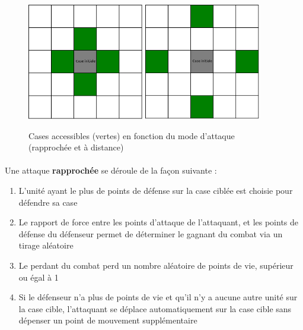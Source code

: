 \begin{figure}
  \centering
  \includegraphics[width=2in]{./schemas/near_attack.png}
  \includegraphics[width=2in]{./schemas/long_attack.png}
  \caption{Cases accessibles (vertes) en fonction du mode d'attaque (rapprochée et à distance)}
  \label{fig:attack}
\end{figure}

\paragraph{}
Une attaque \textbf{rapprochée} se déroule de la façon suivante :

\begin{enumerate}
  \item L'unité ayant le plus de points de défense sur la case ciblée est choisie pour défendre sa case
  \item Le rapport de force entre les points d'attaque de l'attaquant, et les points de défense du défenseur permet de déterminer le gagnant du combat via un tirage aléatoire
  \item Le perdant du combat perd un nombre aléatoire de points de vie, supérieur ou égal à 1
  \item Si le défenseur n'a plus de points de vie et qu'il n'y a aucune autre unité sur la case cible, l'attaquant se déplace automatiquement sur la case cible sans dépenser un point de mouvement supplémentaire
\end{enumerate}

